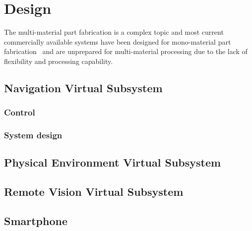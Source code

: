 \chapter{Design}%
\label{ch:design}
  The multi-material part fabrication is a complex topic and most current
  commercially available systems have been designed for mono-material part
  fabrication~\cite{wohlers2011wohlers} and are unprepared for multi-material
  processing due to the lack of flexibility and processing capability.

\section{Navigation Virtual Subsystem}%
\label{sec:navig-virt-subsyst-design}

%
\subsection{Control}%
\label{sec:control-design}


%
\subsection{System design}%
\label{sec:navigation-system-design}

%
\section{Physical Environment Virtual Subsystem}%
\label{sec:phys-envir-virt-design}
%
%
\section{Remote Vision Virtual Subsystem}%
\label{sec:remote-visi-subsyst-design}
%
%
\section{Smartphone}%
\label{sec:smartphone-design}

%
